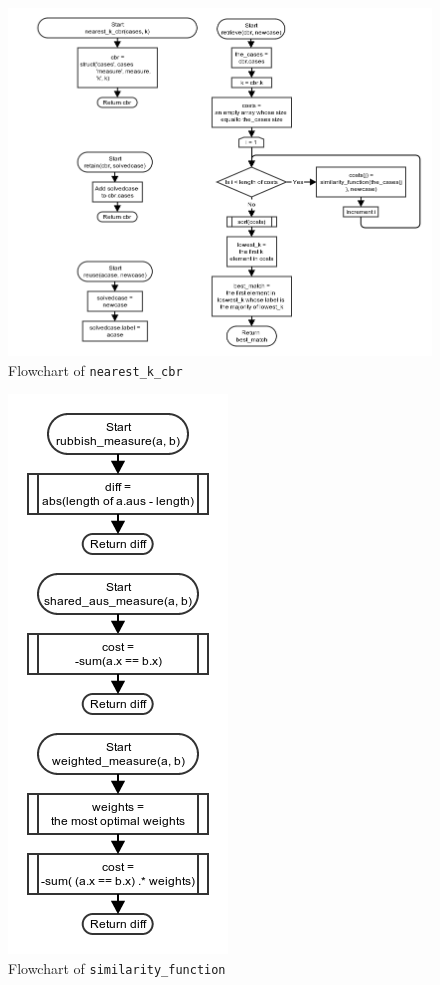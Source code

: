 \documentclass[10pt,a4paper]{article}
\begin{document}
\begin{figure}[!ht]
	\centering
	\includegraphics[scale=0.6]{images/flow_chart/nearest_k_cbr.png}
	\caption{Flowchart of \tt{nearest\_k\_cbr}}
	\label{fig:nearest_k_cbr}
\end{figure}

\begin{figure}[!ht]
	\centering
	\includegraphics[scale=0.7]{images/flow_chart/measure_function.png}
	\caption{Flowchart of \tt{similarity\_function}}
	\label{fig:measure_function}
\end{figure}
\end{document}
